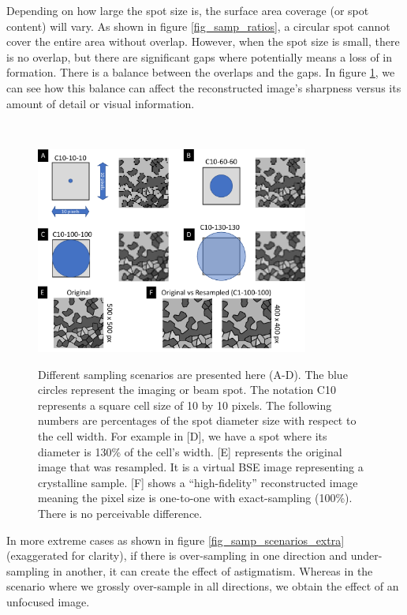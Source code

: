 \documentclass[12pt]{article}
\begin{document}
Depending on how large the spot size is, the surface area coverage (or spot content) will vary. As shown in
figure \ref{fig_samp_ratios}, a circular spot cannot cover the entire area without overlap. However,
when the spot size is small, there is no overlap, but there are significant gaps where potentially 
means a loss of in formation. There is a balance between the overlaps and the gaps. 
In figure \ref{fig_samp_scenarios}, we can see how this balance can affect the reconstructed image's
sharpness versus its amount of detail or visual information.

~\newline

\begin{figure}[h!]
\begin{center}
{
 \includegraphics[width=0.8\textwidth]{figures/spot_ratio/sampling_scenarios.pdf}
}
\caption{\label{fig_samp_scenarios} Different sampling scenarios are presented here (A-D). The blue circles represent the imaging or beam spot. The notation C10 represents a square cell size of 10 by 10 pixels. The following numbers are percentages of the spot diameter size with respect to the cell width. For example in [D], we have a spot where its diameter is 130\% of the cell's width. [E] represents the original image that was resampled. It is a virtual BSE image representing a crystalline sample. [F] shows a ``high-fidelity'' reconstructed image meaning the pixel size is one-to-one with exact-sampling (100\%). There is no perceivable difference.}
\end{center}
\end{figure}

\newpage

In more extreme cases as shown in figure \ref{fig_samp_scenarios_extra} (exaggerated for clarity), 
if there is over-sampling in one direction and under-sampling in another, it can create the effect of 
astigmatism. Whereas in the scenario where we grossly over-sample in all directions, we obtain the 
effect of an unfocused image.
\end{document}
